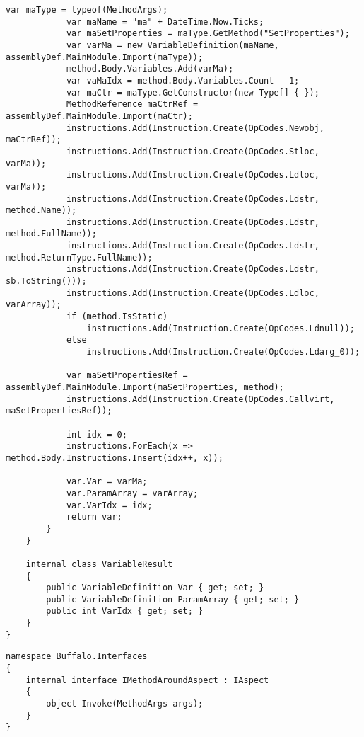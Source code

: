 \begin{lstlisting}[caption={../buffalo/Extensions/Extensions.cs}, label=../buffalo/Extensions/Extensions.cs, frame=tb, basicstyle=\scriptsize]
            var maType = typeof(MethodArgs);
            var maName = "ma" + DateTime.Now.Ticks;
            var maSetProperties = maType.GetMethod("SetProperties");
            var varMa = new VariableDefinition(maName, assemblyDef.MainModule.Import(maType));
            method.Body.Variables.Add(varMa);
            var vaMaIdx = method.Body.Variables.Count - 1;
            var maCtr = maType.GetConstructor(new Type[] { });
            MethodReference maCtrRef = assemblyDef.MainModule.Import(maCtr);
            instructions.Add(Instruction.Create(OpCodes.Newobj, maCtrRef));
            instructions.Add(Instruction.Create(OpCodes.Stloc, varMa));
            instructions.Add(Instruction.Create(OpCodes.Ldloc, varMa));
            instructions.Add(Instruction.Create(OpCodes.Ldstr, method.Name));
            instructions.Add(Instruction.Create(OpCodes.Ldstr, method.FullName));
            instructions.Add(Instruction.Create(OpCodes.Ldstr, method.ReturnType.FullName));
            instructions.Add(Instruction.Create(OpCodes.Ldstr, sb.ToString()));
            instructions.Add(Instruction.Create(OpCodes.Ldloc, varArray));
            if (method.IsStatic)
                instructions.Add(Instruction.Create(OpCodes.Ldnull));
            else
                instructions.Add(Instruction.Create(OpCodes.Ldarg_0));

            var maSetPropertiesRef = assemblyDef.MainModule.Import(maSetProperties, method);
            instructions.Add(Instruction.Create(OpCodes.Callvirt, maSetPropertiesRef));

            int idx = 0;
            instructions.ForEach(x => method.Body.Instructions.Insert(idx++, x));

            var.Var = varMa;
            var.ParamArray = varArray;
            var.VarIdx = idx;
            return var;
        }
    }

    internal class VariableResult
    {
        public VariableDefinition Var { get; set; }
        public VariableDefinition ParamArray { get; set; }
        public int VarIdx { get; set; }
    }
}
\end{lstlisting}

\begin{lstlisting}[caption={../buffalo/Interfaces/IMethodAroundAspect.cs}, label=../buffalo/Interfaces/IMethodAroundAspect.cs, frame=tb, basicstyle=\scriptsize]﻿namespace Buffalo.Interfaces
{
    internal interface IMethodAroundAspect : IAspect
    {
        object Invoke(MethodArgs args);
    }
}
\end{lstlisting}

